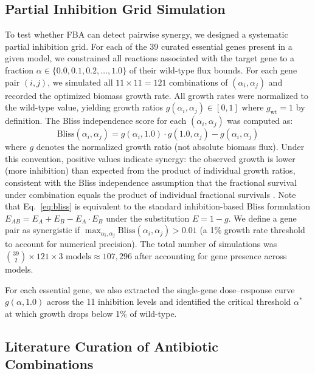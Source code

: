 \documentclass[12pt,a4paper]{article}
\begin{document}
\subsection{Partial Inhibition Grid Simulation}

To test whether FBA can detect pairwise synergy, we designed a systematic partial inhibition grid. For each of the 39 curated essential genes present in a given model, we constrained all reactions associated with the target gene to a fraction $\alpha \in \{0.0, 0.1, 0.2, \ldots, 1.0\}$ of their wild-type flux bounds. For each gene pair $(i, j)$, we simulated all $11 \times 11 = 121$ combinations of $(\alpha_i, \alpha_j)$ and recorded the optimized biomass growth rate. All growth rates were normalized to the wild-type value, yielding growth ratios $g(\alpha_i, \alpha_j) \in [0, 1]$ where $g_{\text{wt}} = 1$ by definition. The Bliss independence score for each $(\alpha_i, \alpha_j)$ was computed as:
\begin{equation}
\text{Bliss}(\alpha_i, \alpha_j) = g(\alpha_i, 1.0) \cdot g(1.0, \alpha_j) - g(\alpha_i, \alpha_j)
\label{eq:bliss}
\end{equation}
where $g$ denotes the normalized growth ratio (not absolute biomass flux). Under this convention, positive values indicate synergy: the observed growth is lower (more inhibition) than expected from the product of individual growth ratios, consistent with the Bliss independence assumption that the fractional survival under combination equals the product of individual fractional survivals \citep{bliss1939}. Note that Eq.~\ref{eq:bliss} is equivalent to the standard inhibition-based Bliss formulation $E_{AB} = E_A + E_B - E_A \cdot E_B$ under the substitution $E = 1 - g$. We define a gene pair as synergistic if $\max_{\alpha_i, \alpha_j} \text{Bliss}(\alpha_i, \alpha_j) > 0.01$ (a 1\% growth rate threshold to account for numerical precision). The total number of simulations was $\binom{39}{2} \times 121 \times 3 \text{ models} \approx 107{,}296$ after accounting for gene presence across models.

For each essential gene, we also extracted the single-gene dose--response curve $g(\alpha, 1.0)$ across the 11 inhibition levels and identified the critical threshold $\alpha^*$ at which growth drops below 1\% of wild-type.

\subsection{Literature Curation of Antibiotic Combinations}
\end{document}
